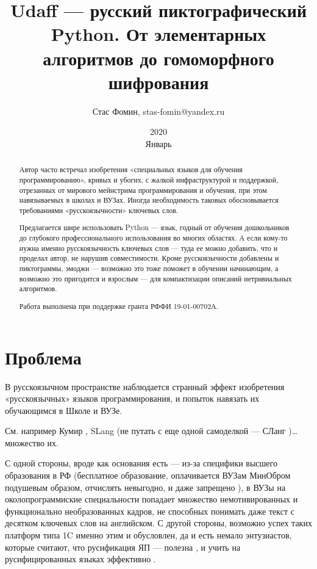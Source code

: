 ﻿\documentclass[a4paper,12pt]{article}
\title{Udaff — русский пиктографический Python. От элементарных алгоритмов до гомоморфного шифрования}
\date{2020 \\ Январь}
\author{Стас Фомин, stas-fomin@yandex.ru}
\begin{document}
\maketitle
\begin{abstract}
    Автор часто встречал изобретения «специальных языков для обучения программированию», кривых и убогих, с жалкой инфраструктурой и поддержкой, отрезанных от мирового мейнстрима программирования и обучения, при этом навязываемых в школах и ВУЗах. Иногда необходимость таковых обосновывается требованиями «русскоязычности» ключевых слов. 

    Предлагается шире использовать Python — язык, годный от обучения дошкольников до глубокого профессионального использования во многих областях. А если кому-то нужна именно русскоязычность ключевых слов — туда ее можно добавить, что и проделал автор, не нарушив совместимости. Кроме русскоязычности добавлены и пиктограммы, эмоджи — возможно это тоже поможет в обучении начинающим, а возможно это пригодится и взрослым — для компактизации описаний нетривиальных алгоритмов.

    Работа выполнена при поддержке гранта РФФИ 19-01-00702А.
\end{abstract}

\section{Проблема}

В русскоязычном пространстве наблюдается странный эффект изобретения
«русскоязычных» языков программирования, и попыток навязать их
обучающимся в Школе и ВУЗе.  

См. например Кумир \cite{kumir}, SLang \cite{slang}
(не путать с еще одной самоделкой --- СЛанг \cite{slang2})\ldots{} множество их.
  
С одной стороны, вроде как основания есть --- из-за специфики высшего
образования в РФ (бесплатное образование, оплачивается ВУЗам МинОбром
подушевым образом, отчислять невыгодно, и даже запрещено \cite{fire-restricted}), 
в ВУЗы на околопрограммиские специальности попадает множество немотивированных и
функционально необразованных кадров, не способных понимать даже текст с
десятком ключевых слов на английском. С другой стороны, возможно успех
таких платформ типа 1C именно этим и обусловлен, да и есть немало
энтузиастов, которые
считают, что русификация ЯП --- полезна \cite{russification-good}, и
учить на русифицированных
языках эффективно \cite{russification-effective}.
\end{document}
